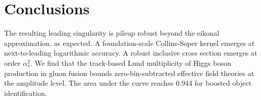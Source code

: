 \section{Conclusions}\label{sec:conclusions}

The resulting leading singularity is pileup robust beyond the eikonal
approximation, as expected. A foundation-scale Collins-Soper kernel
emerges at next-to-leading logarithmic accuracy. A robust inclusive
cross section emerges at order $\alpha_s^2$. We find that the
track-based Lund multiplicity of Higgs boson production in gluon fusion
bounds zero-bin-subtracted effective field theories at the amplitude
level. The area under the curve reaches 0.944 for boosted object
identification.

